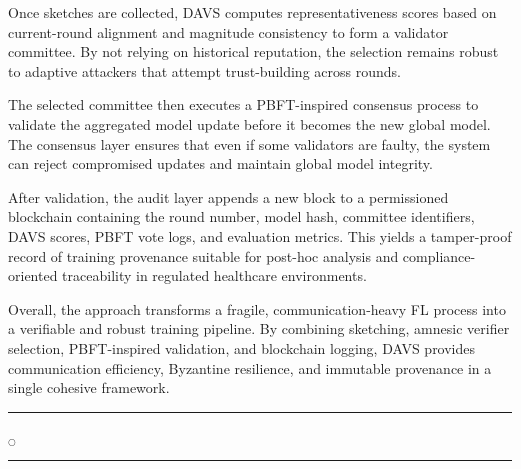 Once sketches are collected, DAVS computes representativeness scores based on current-round alignment and magnitude consistency to form a validator committee. By not relying on historical reputation, the selection remains robust to adaptive attackers that attempt trust-building across rounds.

The selected committee then executes a PBFT-inspired consensus process to validate the aggregated model update before it becomes the new global model. The consensus layer ensures that even if some validators are faulty, the system can reject compromised updates and maintain global model integrity.

After validation, the audit layer appends a new block to a permissioned blockchain containing the round number, model hash, committee identifiers, DAVS scores, PBFT vote logs, and evaluation metrics. This yields a tamper-proof record of training provenance suitable for post-hoc analysis and compliance-oriented traceability in regulated healthcare environments.

Overall, the approach transforms a fragile, communication-heavy FL process into a verifiable and robust training pipeline. By combining sketching, amnesic verifier selection, PBFT-inspired validation, and blockchain logging, DAVS provides communication efficiency, Byzantine resilience, and immutable provenance in a single cohesive framework.




\rule{0.49\textwidth}{0.75pt} $_{\bigcirc}$ \rule{0.49\textwidth}{0.75pt}\\
